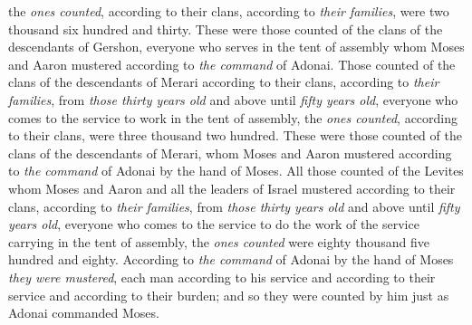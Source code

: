 \begin{biblechapter}
\verse the \textit{ones counted}, according to their clans, according to \textit{their families}, were two thousand six hundred and thirty.
\verse These were those counted of the clans of the descendants of Gershon, everyone who serves in the tent of assembly whom Moses and Aaron mustered according to \textit{the command} of Adonai.
\verse Those counted of the clans of the descendants of Merari according to their clans, according to \textit{their families},
\verse from \textit{those thirty years old} and above until \textit{fifty years old}, everyone who comes to the service to work in the tent of assembly,
\verse the \textit{ones counted}, according to their clans, were three thousand two hundred.
\verse These were those counted of the clans of the descendants of Merari, whom Moses and Aaron mustered according to \textit{the command} of Adonai by the hand of Moses.
\verse All those counted of the Levites whom Moses and Aaron and all the leaders of Israel mustered according to their clans, according to \textit{their families},
\verse from \textit{those thirty years old} and above until \textit{fifty years old}, everyone who comes to the service to do the work of the service carrying in the tent of assembly,
\verse the \textit{ones counted} were eighty thousand five hundred and eighty.
\verse According to \textit{the command} of Adonai by the hand of Moses \textit{they were mustered}, each man according to his service and according to their service and according to their burden; and so they were counted by him just as Adonai commanded Moses.
\end{biblechapter}

